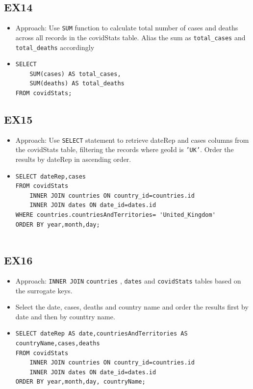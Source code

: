 \documentclass[12pt,oneside,a4paper,english]{article}
\begin{document}
\subsection{EX14}
\begin{itemize}
    \item Approach: Use \texttt{SUM} function to calculate total number of cases and deaths across all records in the covidStats table. Alias the sum as \texttt{total\_cases} and \texttt{total\_deaths} accordingly 

\item
\begin{lstlisting}
SELECT
    SUM(cases) AS total_cases,
    SUM(deaths) AS total_deaths
FROM covidStats;

\end{lstlisting}
\end{itemize}

\subsection{EX15}
\begin{itemize}
    \item Approach: Use \texttt{SELECT} statement to retrieve dateRep and cases columns from the covidStats table, filtering the records where geoId is \texttt{'UK'}. Order the results by dateRep in ascending order.

\item
\begin{lstlisting}
SELECT dateRep,cases
FROM covidStats
    INNER JOIN countries ON country_id=countries.id
    INNER JOIN dates ON date_id=dates.id
WHERE countries.countriesAndTerritories= 'United_Kingdom'
ORDER BY year,month,day;


\end{lstlisting}
\end{itemize}

\subsection{EX16}
\begin{itemize}
    \item Approach: \texttt{INNER JOIN} \texttt{countries} , \texttt{dates} and \texttt{covidStats} tables based on the surrogate keys.
    \item Select the date, cases, deaths and country name and order the results first by date and then by counttry name.

\item
\begin{lstlisting}
SELECT dateRep AS date,countriesAndTerritories AS countryName,cases,deaths
FROM covidStats
    INNER JOIN countries ON country_id=countries.id
    INNER JOIN dates ON date_id=dates.id
ORDER BY year,month,day, countryName;

\end{lstlisting}
\end{itemize}
\end{document}
